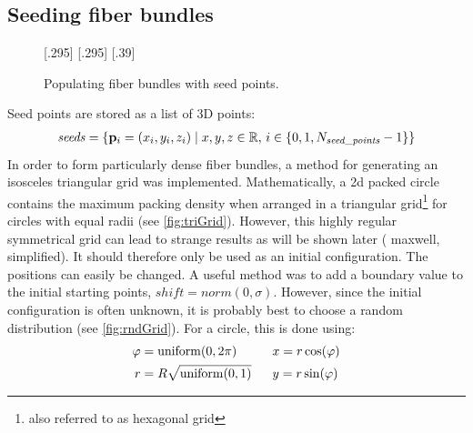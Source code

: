 \subsection{Seeding fiber bundles}\label{sec:seeds}
% 
\begin{figure}[!t]
    \def\tikzheight{0.25\textwidth}
    \centering
    [.295\textwidth]{
    \hfill}
    [.295\textwidth]{
    }\hfill
    [.39\textwidth]{
    }
	\caption{Populating fiber bundles with seed points.}
\end{figure}
% 
Seed points are stored as a list of 3D points:
\begin{align}
\mathit{seeds} = \left\{ \mathbf{p}_i=(x_i,y_i,z_i) \mid x,y,z \in \mathbb{R} , \, i \in \{0,1,N_{\mathit{seed\_points}}-1\}\right\}
\end{align}
% 
In order to form particularly dense fiber bundles, a method for generating an isosceles triangular grid was implemented.
Mathematically, a 2d packed circle contains the maximum packing density when arranged in a triangular grid\footnote{also referred to as hexagonal grid} for circles with equal radii (see \ref{fig:triGrid}).
However, this highly regular symmetrical grid can lead to strange results as will be shown later (\eg{} maxwell, simplified).
It should therefore only be used as an initial configuration. 
The positions can easily be changed.
A useful method was to add a boundary value to the initial starting points, \eg{} $\mathit{shift} = norm(0,\sigma)$.
However, since the initial configuration is often unknown, it is probably best to choose a random distribution (see \cref{fig:rndGrid}).
For a circle, this is done using:
\begin{equation}
\begin{aligned}
 \varphi &= \mathrm{uniform}(0,2 \pi) \hspace{4.2ex} && x = r \cos(\varphi)\\
 r &= R \sqrt{\mathrm{uniform}(0,1)} && y = r \sin(\varphi)
\end{aligned}
\end{equation}
% 
